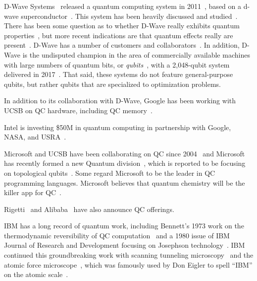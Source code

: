 D-Wave Systems~\cite{D-WaveSystemsHomePage}
released a quantum computing system
in 2011~\cite{WikipediaD-WaveSystems}, based on a d-wave
superconductor~\cite{MHSAmin2000D-Wave-superconductor}.
This system has been heavily discussed and
studied~\cite{KamranKarimi2011D-WaveAdiabatic}.
There has been some question as to whether D-Wave really exhibits quantum
properties~\cite{SeungWooShin2014IsDwaveQuantum}, but more recent
indications are that quantum effects really are
present~\cite{PhysRevA.91.042314,PhysRevX.4.021041}.
D-Wave has a number of customers and
collaborators~\cite{JeffreyBurt2014Google-QC-Chip,PatrickHarris2015QC-Google-NASA-DWave,ToddRWeiss2013Google-QC-AI-Lab}.
In addition, D-Wave is the undisputed champion in the area of commercially
available machines with large numbers of quantum bits, or
\emph{qubits}~\cite{WikipediaD-WaveSystems},
with a 2,048-qubit system delivered in
2017~\cite{AgamShah2016D-Wave-2000-qubit,BradJones2017D-Wave2000Sale}.
That said, these systems do not feature general-purpose qubits, but
rather qubits that are specialized to optimization problems.

In addition to its collaboration with D-Wave, Google has been working
with UCSB on QC hardware, including
QC memory~\cite{JaikumarVijayan2015Google-UCSB-QC-Memory}.

Intel is investing \$50M in quantum computing in partnership
with Google, NASA, and USRA~\cite{StaceyHigginbotham2015Intel-QC-invest-50M}.

Microsoft and UCSB have been collaborating on QC since
2004~\cite{PedroHernandez2014MicrosoftStationQ-QC}
and Microsoft has recently formed a new Quantum
division~\cite{PedroHernandez2016Microsoft-QC}, which is reported to
be focusing on topological
qubits~\cite{PeterBright2018UsoftTopoQubit,WikipediaTopologicalQuantumComputer}.
Some regard Microsoft to be the leader in QC programming languages.
Microsoft believes that quantum chemistry will be the killer app
for QC~\cite{TomSimonite2017QC-MS-Chemistry}.

Rigetti~\cite{Rigetti2018QC}
and Alibaba~\cite{ZenSoo2018AlibabaQC}
have also announce QC offerings.

IBM has a long record of quantum work, including Bennett's
1973 work on the thermodynamic reversibility of QC
computation~\cite{Bennett:1973:LRC:1664562.1664568} and a 1980 issue
of IBM Journal of Research and Development focusing on Josephson
technology~\cite{1980:1663086}.
IBM continued this groundbreaking work with scanning tunneling
microscopy~\cite{Binnig1982SurfaceSTM}
and the atomic force microscope~\cite{1986PhRvL..56..930B},
which was famously used by Don Eigler to spell ``IBM'' on the atomic
scale~\cite{MalcolmWBrowne1990AFM-IBM}.

